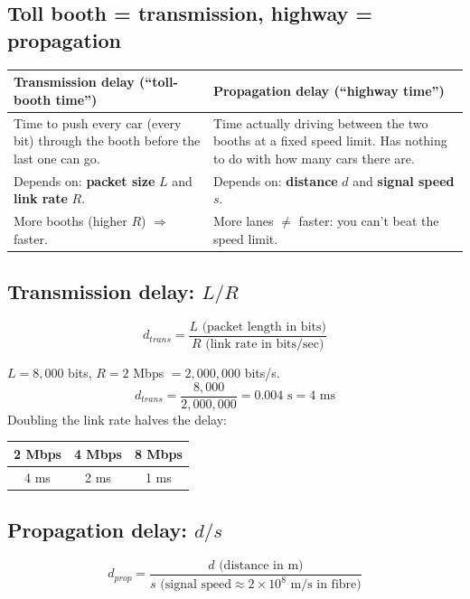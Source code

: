\subsection{Toll booth = transmission, highway = propagation}
\begin{center}
\begin{tabularx}{\textwidth}{X X}
\toprule
\textbf{Transmission delay (``toll-booth time'')} & \textbf{Propagation delay (``highway time'')} \\
\midrule
Time to push every car (every bit) through the booth before the last one can go. & Time actually driving between the two booths at a fixed speed limit. Has nothing to do with how many cars there are. \\
Depends on: \textbf{packet size} $L$ and \textbf{link rate} $R$. & Depends on: \textbf{distance} $d$ and \textbf{signal speed} $s$. \\
More booths (higher $R$) $\Rightarrow$ faster. & More lanes $\neq$ faster: you can't beat the speed limit. \\
\bottomrule
\end{tabularx}
\end{center}

\subsection{Transmission delay: $L/R$}
\[
d_{trans} = \frac{L \text{ (packet length in bits)}}{R \text{ (link rate in bits/sec)}}
\]
\begin{workedex}
$L = 8{,}000$ bits, $R = 2$ Mbps $= 2{,}000{,}000$ bits/s.
\[ d_{trans} = \frac{8{,}000}{2{,}000{,}000} = 0.004 \text{ s} = 4 \text{ ms} \]
Doubling the link rate halves the delay:
\begin{center}
\begin{tabular}{ccc}
\toprule
2 Mbps & 4 Mbps & 8 Mbps \\
\midrule
4 ms & 2 ms & 1 ms \\
\bottomrule
\end{tabular}
\end{center}
\end{workedex}

\subsection{Propagation delay: $d/s$}
\[
d_{prop} = \frac{d \text{ (distance in m)}}{s \text{ (signal speed} \approx 2\times 10^8 \text{ m/s in fibre)}}
\]

